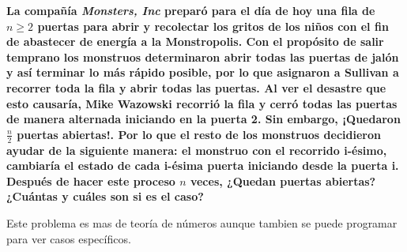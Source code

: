 \textbf{La compañía \textit{Monsters, Inc} preparó para el día de hoy una fila de $n \geq 2$ puertas para abrir y recolectar los gritos de los niños con el fin de abastecer de energía a la Monstropolis. Con el propósito de salir temprano los monstruos determinaron abrir todas las puertas de jalón y así terminar lo más rápido posible, por lo que asignaron a Sullivan a recorrer toda la fila y abrir todas las puertas. Al ver el desastre que esto causaría, Mike Wazowski recorrió la fila y cerró todas las puertas de manera alternada iniciando en la puerta 2. Sin embargo, ¡Quedaron $\frac{n}{2}$ puertas abiertas!. Por lo que el resto de los monstruos decidieron ayudar de la siguiente manera: el monstruo con el recorrido i-ésimo, cambiaría el estado de cada i-ésima puerta iniciando desde la puerta i. Después de hacer este proceso $n$ veces, ¿Quedan puertas abiertas? ¿Cuántas y cuáles son si es el caso?}\vspace{.2cm}

Este problema es mas de teoría de números aunque tambien se puede programar para ver casos específicos.

